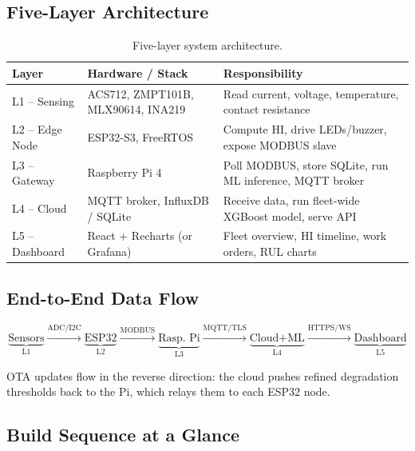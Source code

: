 \documentclass[12pt,a4paper]{article}
\begin{document}
\subsection{Five-Layer Architecture}

\begin{table}[H]
\centering
\renewcommand{\arraystretch}{1.35}
\begin{tabularx}{\textwidth}{llX}
\toprule
\textbf{Layer} & \textbf{Hardware / Stack} & \textbf{Responsibility} \\
\midrule
L1 -- Sensing      & ACS712, ZMPT101B, MLX90614, INA219 & Read current, voltage, temperature, contact resistance \\
L2 -- Edge Node    & ESP32-S3, FreeRTOS & Compute HI, drive LEDs/buzzer, expose MODBUS slave \\
L3 -- Gateway      & Raspberry Pi 4 & Poll MODBUS, store SQLite, run ML inference, MQTT broker \\
L4 -- Cloud        & MQTT broker, InfluxDB / SQLite & Receive data, run fleet-wide XGBoost model, serve API \\
L5 -- Dashboard    & React + Recharts (or Grafana) & Fleet overview, HI timeline, work orders, RUL charts \\
\bottomrule
\end{tabularx}
\caption{Five-layer system architecture.}
\end{table}

\subsection{End-to-End Data Flow}

\[
\underbrace{\text{Sensors}}_{\text{L1}}
\xrightarrow{\text{ADC/I2C}}
\underbrace{\text{ESP32}}_{\text{L2}}
\xrightarrow{\text{MODBUS}}
\underbrace{\text{Rasp.~Pi}}_{\text{L3}}
\xrightarrow{\text{MQTT/TLS}}
\underbrace{\text{Cloud+ML}}_{\text{L4}}
\xrightarrow{\text{HTTPS/WS}}
\underbrace{\text{Dashboard}}_{\text{L5}}
\]

\noindent OTA updates flow in the reverse direction: the cloud pushes refined degradation thresholds back to
the Pi, which relays them to each ESP32 node.

\subsection{Build Sequence at a Glance}
\end{document}
